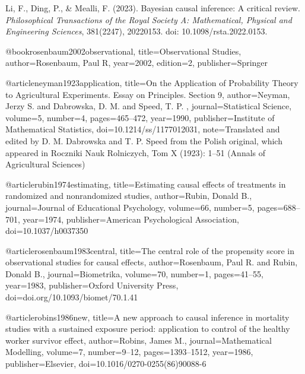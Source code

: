 Li, F., Ding, P., \& Mealli, F. (2023).
Bayesian causal inference: A critical review.
\textit{Philosophical Transactions of the Royal Society A: Mathematical, Physical and Engineering Sciences}, 381(2247), 20220153.
doi: 10.1098/rsta.2022.0153.




















@book{rosenbaum2002observational,
 title={Observational Studies},
 author={Rosenbaum, Paul R},
 year={2002},
 edition={2},
 publisher={Springer}
}




@article{neyman1923application,
  title={On the Application of Probability Theory to Agricultural Experiments. Essay on Principles. Section 9},
  author={Neyman, Jerzy S. and Dabrowska, D. M. and  Speed, T. P. },
  journal={Statistical Science},
  volume={5},
  number={4},
  pages={465--472},
  year={1990},
  publisher={Institute of Mathematical Statistics},
  doi={10.1214/ss/1177012031},
  note={Translated and edited by D. M. Dabrowska and T. P. Speed from the Polish original, which appeared in Roczniki Nauk Rolniczych, Tom X (1923): 1–51 (Annals of Agricultural Sciences)}
}






@article{rubin1974estimating,
  title={Estimating causal effects of treatments in randomized and nonrandomized studies},
  author={Rubin, Donald B.},
  journal={Journal of Educational Psychology},
  volume={66},
  number={5},
  pages={688--701},
  year={1974},
  publisher={American Psychological Association},
  doi={10.1037/h0037350}
}





@article{rosenbaum1983central,
  title={The central role of the propensity score in observational studies for causal effects},
  author={Rosenbaum, Paul R. and Rubin, Donald B.},
  journal={Biometrika},
  volume={70},
  number={1},
  pages={41--55},
  year={1983},
  publisher={Oxford University Press},
  doi={doi.org/10.1093/biomet/70.1.41}
}





@article{robins1986new,
  title={A new approach to causal inference in mortality studies with a sustained exposure period: application to control of the healthy worker survivor effect},
  author={Robins, James M.},
  journal={Mathematical Modelling},
  volume={7},
  number={9--12},
  pages={1393--1512},
  year={1986},
  publisher={Elsevier},
  doi={10.1016/0270-0255(86)90088-6}
}





